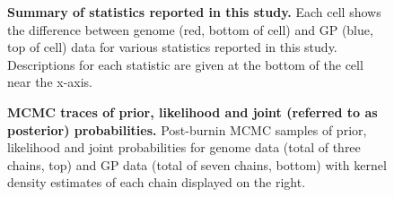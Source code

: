 \documentclass{bmcart}
\def\texttt{[image: ]}
\begin{document}
\begin{figure}[h]
 \centering
	\caption{\textbf{Summary of statistics reported in this study.}
  Each cell shows the difference between genome (red, bottom of cell) and GP (blue, top of cell) data for various statistics reported in this study.
  Descriptions for each statistic are given at the bottom of the cell near the x-axis.
	}
	\label{summary}
\end{figure}

\begin{figure}[h]
 \centering
  \caption{\textbf{MCMC traces of prior, likelihood and joint (referred to as posterior) probabilities.}
  Post-burnin MCMC samples of prior, likelihood and joint probabilities for genome data (total of three chains, top) and GP data (total of seven chains, bottom) with kernel density estimates of each chain displayed on the right.
  }
	\label{mcmc}
\end{figure}
\end{document}
